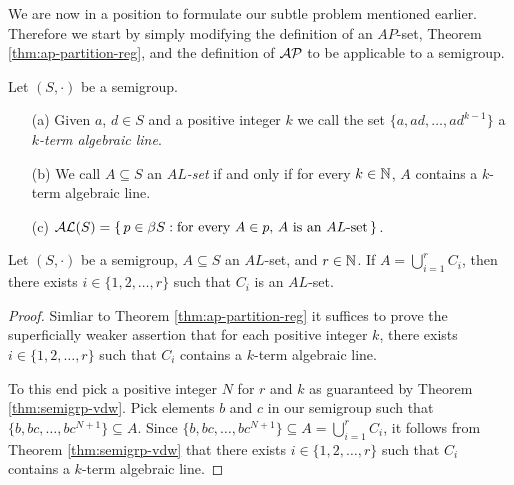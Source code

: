 We are now in a position to formulate our subtle problem mentioned earlier.
Therefore we start by simply modifying the definition of an $AP$-set, Theorem \ref{thm:ap-partition-reg}, and the definition of $\mathcal{AP}$ to be applicable to a semigroup.

\begin{defn}
  Let $(S, \cdot)$ be a semigroup.
  \begin{itemize}
    \item[(a)] Given $a$, $d \in S$ and a positive integer $k$ we call the set $\{a, ad, \ldots, ad^{k-1}\}$ a \emph{$k$-term algebraic line}. 

    \item[(b)] We call $A \subseteq S$ an \emph{$AL$-set} if and only if for every $k \in \mathbb{N}$, $A$ contains a $k$-term algebraic line.

    \item[(c)] $\mathcal{AL}(S) = \{\, p \in \beta S : \mbox{for every $A \in p$, $A$ is an $AL$-set} \,\}$.
  \end{itemize}
\end{defn}

\begin{thm}
  \label{thm:al-partition-reg}
  Let $(S, \cdot)$ be a semigroup, $A \subseteq S$ an $AL$-set, and $r \in \mathbb{N}$.
  If $A = \bigcup_{i=1}^r C_i$, then there exists $i \in \{1, 2, \ldots, r\}$ such that $C_i$ is an $AL$-set.
\end{thm}
\begin{proof}
  Simliar to Theorem \ref{thm:ap-partition-reg} it suffices to prove the superficially weaker assertion that for each positive integer $k$, there exists $i \in \{1, 2, \ldots, r\}$ such that $C_i$ contains a $k$-term algebraic line.
  
  To this end pick a positive integer $N$ for $r$ and $k$ as guaranteed by Theorem \ref{thm:semigrp-vdw}. 
  Pick elements $b$ and $c$ in our semigroup such that $\{b, bc, \ldots, bc^{N+1}\} \subseteq A$. 
  Since $\{b, bc, \ldots, bc^{N+1}\} \subseteq A = \bigcup_{i=1}^r C_i$, it follows from Theorem \ref{thm:semigrp-vdw} that there exists $i \in \{1, 2, \ldots, r\}$ such that $C_i$ contains a $k$-term algebraic line.
\end{proof}

